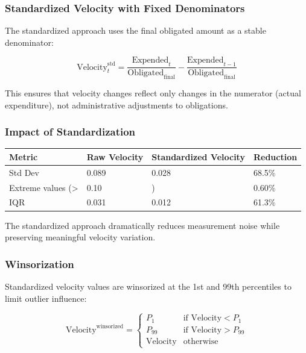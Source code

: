\documentclass[
  12pt,
  letterpaper,
]{article}
\begin{document}
\subsubsection{Standardized Velocity with Fixed
Denominators}\label{standardized-velocity-with-fixed-denominators}

The standardized approach uses the final obligated amount as a stable
denominator:

\[
\text{Velocity}_t^{\text{std}} = \frac{\text{Expended}_t}{\text{Obligated}_{\text{final}}} - \frac{\text{Expended}_{t-1}}{\text{Obligated}_{\text{final}}}
\]

This ensures that velocity changes reflect only changes in the numerator
(actual expenditure), not administrative adjustments to obligations.

\subsubsection{Impact of
Standardization}\label{impact-of-standardization}

\begin{longtable}[]{@{}llll@{}}
\toprule\noalign{}
Metric & Raw Velocity & Standardized Velocity & Reduction \\
\midrule\noalign{}
\endhead
\bottomrule\noalign{}
\endlastfoot
Std Dev & 0.089 & 0.028 & 68.5\% \\
Extreme values (\textgreater{} & 0.10 & ) & 0.60\% \\
IQR & 0.031 & 0.012 & 61.3\% \\
\end{longtable}

The standardized approach dramatically reduces measurement noise while
preserving meaningful velocity variation.

\subsubsection{Winsorization}\label{winsorization}

Standardized velocity values are winsorized at the 1st and 99th
percentiles to limit outlier influence:

\[
\text{Velocity}^{\text{winsorized}} = \begin{cases}
P_1 & \text{if } \text{Velocity} < P_1 \\
P_{99} & \text{if } \text{Velocity} > P_{99} \\
\text{Velocity} & \text{otherwise}
\end{cases}
\]
\end{document}
